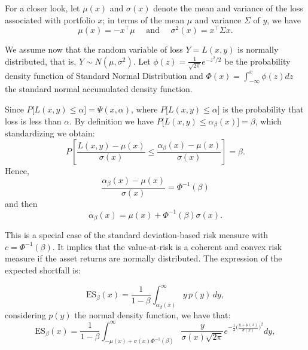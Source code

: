 For a closer look, let $\mu(x)$ and $\sigma(x)$ denote the mean and variance of the loss associated with portfolio $x$; in terms of the mean $\mu$ and variance $\Sigma$ of $y$, we have
\[
	\mu(x) = -x^\top \mu \quad \mbox{ and } \quad \sigma^2(x) = x^\top \Sigma x.
\]





We assume now that the random variable of loss $Y=L(x,y)$ is normally distributed, that is, $Y\sim N(\mu,\sigma^2)$. Let $\phi(z) = \frac{1}{\sqrt{2\pi}}e^{-z^2/2}$ be the probability density function of Standard Normal Distribution and $\Phi(x) = \int_{-\infty}^{x}\phi(z) dz$
the standard normal accumulated density function.

Since $P\big[L(x,y)\leq \alpha\big]= \Psi(x,\alpha)$, where $P\big[L(x,y)\leq \alpha\big]$ is the probability that loss is less than $\alpha$. By definition we have
$P\big[L(x,y)\leq \alpha_\beta(x)\big]=\beta$, which standardizing we obtain:
\[
	P\left[ \frac{L(x,y)-\mu(x)}{\sigma(x)} \leq \frac{\alpha_\beta(x)-\mu(x)}{\sigma(x)}
		\right]=\beta.
\]
Hence,
\[
	\frac{\alpha_\beta(x)-\mu(x)}{\sigma(x)}=\Phi^{-1}(\beta)
\] and then
\begin{equation}\label{eq:var2}
	\alpha_\beta(x)=\mu(x)+ \Phi^{-1}(\beta)\sigma(x).
\end{equation}

This is a special case of the standard deviation-based risk measure with $c = \Phi^{-1} (\beta)$. It implies that the value-at-risk is a coherent and convex risk measure if the asset returns are normally distributed. The expression of the expected shortfall is:

\[
	\mbox{ES}_\beta(x) = \frac{1}{1-\beta}\int_{\alpha_\beta(x)}^\infty y\, p(y)\,dy,
\] considering $p(y)$ the normal density function, we have that:
\[
	\mbox{ES}_\beta(x) = \frac{1}{1-\beta}\int_{-\mu(x)+ \sigma(x)\Phi^{-1}(\beta)} ^\infty \frac{y}{\sigma(x)\sqrt{2\pi}} e^{-\frac{1}{2}\big(\frac{y+\mu(x)}{\sigma (x)}\big)^2} dy,
\]

